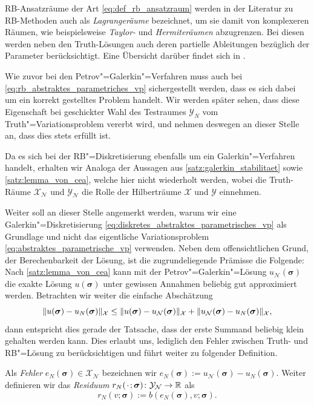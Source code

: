\documentclass[../main.tex]{subfiles}
\begin{document}
RB-Ansatzräume der Art \cref{eq:def_rb_ansatzraum} werden in der Literatur zu RB-Methoden auch als \emph{Lagrangeräume} bezeichnet, um sie damit von komplexeren Räumen, wie beispielsweise \emph{Taylor-} und \emph{Hermiteräumen} abzugrenzen.
Bei diesen werden neben den Truth-Lösungen auch deren partielle Ableitungen bezüglich der Parameter berücksichtigt.
Eine Übersicht darüber findet sich in \cite[Chapter 3]{Patera:2007un}.

Wie zuvor bei den Petrov"=Galerkin"=Verfahren muss auch bei \cref{eq:rb_abstraktes_parametriches_vp} sichergestellt werden, dass es sich dabei um ein korrekt gestelltes Problem handelt.
Wir werden später sehen, dass diese Eigenschaft bei geschickter Wahl des Testraumes $\mathcal Y_{N}$ vom Truth"=Variationsproblem vererbt wird, und nehmen deswegen an dieser Stelle an, dass dies stets erfüllt ist.

Da es sich bei der RB"=Diskretisierung ebenfalls um ein Galerkin"=Verfahren handelt, erhalten wir Analoga der Aussagen aus \cref{satz:galerkin_stabilitaet} sowie \cref{satz:lemma_von_cea}, welche hier nicht wiederholt werden, wobei die Truth-Räume $\mathcal X_{\mathcal N}$ und $\mathcal Y_{\mathcal N}$ die Rolle der Hilberträume $\mathcal X$ und $\mathcal Y$ einnehmen.

Weiter soll an dieser Stelle angemerkt werden, warum wir eine Galerkin"=Diskretisierung \cref{eq:diskretes_abstraktes_parametrisches_vp} als Grundlage und nicht das eigentliche Variationsproblem \cref{eq:abstraktes_parametrische_vp} verwenden.
Neben dem offensichtlichen Grund, der Berechenbarkeit der Lösung, ist die zugrundeliegende Prämisse die Folgende:
Nach \cref{satz:lemma_von_cea} kann mit der Petrov"=Galerkin"=Lösung $u_{\mathcal N}(\bm \sigma)$ die exakte Lösung $u(\bm \sigma)$ unter gewissen Annahmen beliebig gut approximiert werden.
Betrachten wir weiter die einfache Abschätzung
\begin{equation}
    \lVert u(\bm \sigma) - u_{N}(\bm \sigma)\rVert_{\mathcal X} \leq \lVert u(\bm \sigma) - u_{\mathcal N}(\bm \sigma)\rVert_{\mathcal X} + \lVert u_{\mathcal N}(\bm \sigma) - u_{N}(\bm \sigma)\rVert_{\mathcal X},
\end{equation}
dann entspricht dies gerade der Tatsache, dass der erste Summand beliebig klein gehalten werden kann.
Dies erlaubt uns, lediglich den Fehler zwischen Truth- und RB"=Lösung zu berücksichtigen und führt weiter zu folgender Definition.

\begin{Definition}\label{definition:rbm_fehler_und_residuum}
    Als \emph{Fehler} $e_{N}(\bm \sigma) \in \mathcal X_{\mathcal N}$ bezeichnen wir $e_{N}(\bm \sigma) := u_{\mathcal N}(\bm \sigma) - u_{N}(\bm \sigma)$.
    Weiter definieren wir das \emph{Residuum} $r_{N}({\mkern2mu\cdot\mkern2mu}; \bm \sigma) \colon \mathcal Y_{\mathcal N} \to \mathbb{R}$ als
    \begin{equation}\label{eq:variationsproblem_residuum}
        r_{N}(v; \bm \sigma) := b(e_{N}(\bm \sigma), v; \bm \sigma).
    \end{equation}
\end{Definition}
\end{document}
